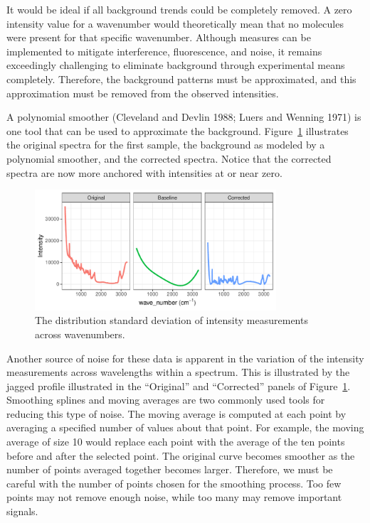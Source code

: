 \documentclass[
  letterpaper,
  DIV=11,
  numbers=noendperiod]{scrartcl}
\begin{document}
It would be ideal if all background trends could be completely removed.
A zero intensity value for a wavenumber would theoretically mean that no
molecules were present for that specific wavenumber. Although measures
can be implemented to mitigate interference, fluorescence, and noise, it
remains exceedingly challenging to eliminate background through
experimental means completely. Therefore, the background patterns must
be approximated, and this approximation must be removed from the
observed intensities.

A polynomial smoother (Cleveland and Devlin 1988; Luers and Wenning
1971) is one tool that can be used to approximate the background.
Figure~\ref{fig-profile-baseline-poly} illustrates the original spectra
for the first sample, the background as modeled by a polynomial
smoother, and the corrected spectra. Notice that the corrected spectra
are now more anchored with intensities at or near zero.

\begin{figure}[t!]

{\centering \includegraphics[width=0.8\textwidth,height=\textheight]{figures/fig-profile-baseline-poly-1.pdf}

}

\caption{\label{fig-profile-baseline-poly}The distribution standard
deviation of intensity measurements across wavenumbers.}

\end{figure}

Another source of noise for these data is apparent in the variation of
the intensity measurements across wavelengths within a spectrum. This is
illustrated by the jagged profile illustrated in the ``Original'' and
``Corrected'' panels of Figure~\ref{fig-profile-baseline-poly}.
Smoothing splines and moving averages are two commonly used tools for
reducing this type of noise. The moving average is computed at each
point by averaging a specified number of values about that point. For
example, the moving average of size 10 would replace each point with the
average of the ten points before and after the selected point. The
original curve becomes smoother as the number of points averaged
together becomes larger. Therefore, we must be careful with the number
of points chosen for the smoothing process. Too few points may not
remove enough noise, while too many may remove important signals.
\end{document}
